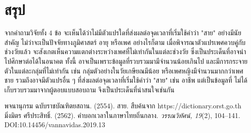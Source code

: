 \documentclass[a4paper]{article}
\begin{document}
\section{สรุป}
    จากคำถามวิจัยทั้ง 4 ข้อ จะเห็นได้ว่าไม่มีตัวแปรใดที่ส่งผลต่อจุดเวลาที่เริ่มใช้คำว่า "สาย" อย่างมีนัยสำคัญ ไม่ว่าจะเป็นปัจจัยทางภูมิศาสตร์ อายุ หรือเพศ อย่างไรก็ตาม เมื่อพิจารณาตัวแปรเพศควบคู่กับช่วงวัยแล้ว จะสังเกตเห็นความแตกต่างระหว่างเพศที่ไม่เท่ากันในแต่ละช่วงวัย ซึ่งเป็นประเด็นที่อาจนำไปศึกษาต่อได้ในอนาคต ทั้งนี้ อาจเป็นเพราะข้อมูลที่รวบรวมมามีจำนวนน้อยเกินไป และมีการกระจายตัวในแต่ละกลุ่มที่ไม่เท่ากัน เช่น กลุ่มตัวอย่างในวัยเกษียณมีน้อย หรือเพศหญิงมีจำนวนมากกว่าเพศชาย รวมถึงอาจมีตัวแปรอื่น ๆ ที่ส่งผลต่อจุดเวลาที่เริ่มใช้คำว่า "สาย" เช่น อาชีพ แต่เป็นข้อมูลที่ ไม่ได้เก็บรวบรวมมาจากผู้ตอบแบบสอบถาม จึงเป็นประเด็นที่น่าสนใจเช่นกัน
\begin{thebibliography}{9}
     พจนานุกรม ฉบับราชบัณฑิตยสถาน. (2554). สาย. สืบค้นจาก https://dictionary.orst.go.th
     มิ่งมิตร ศรีประสิทธิ์. (2562). คำบอกเวลาในภาษาไทยถิ่นกลาง. \textit{วรรณวิทัศน์, 19}(2), 104–141. DOI:10.14456/vannavidas.2019.13
\end{thebibliography}
\end{document}
